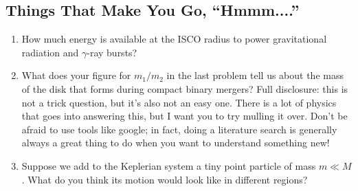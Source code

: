 \documentclass[11pt]{article}
\begin{document}
\begin{mdframed}

\section*{Things That Make You Go, ``Hmmm....''}

\begin{enumerate}

\item How much energy is available at the ISCO radius to power gravitational radiation and $\gamma$-ray bursts?

\item What does your figure for $m_1/m_2$ in the last problem tell us about the mass of the disk that forms during compact binary mergers? Full disclosure: this is not a trick question, but it's also not an easy one. There is a lot of physics that goes into answering this, but I want you to try mulling it over. Don't be afraid to use tools like google; in fact, doing a literature search is generally always a great thing to do when you want to understand something new!

\item Suppose we add to the Keplerian system a tiny point particle of mass $m \ll M$. What do you think its motion would look like in different regions?

\end{enumerate}

\end{mdframed}
\end{document}
